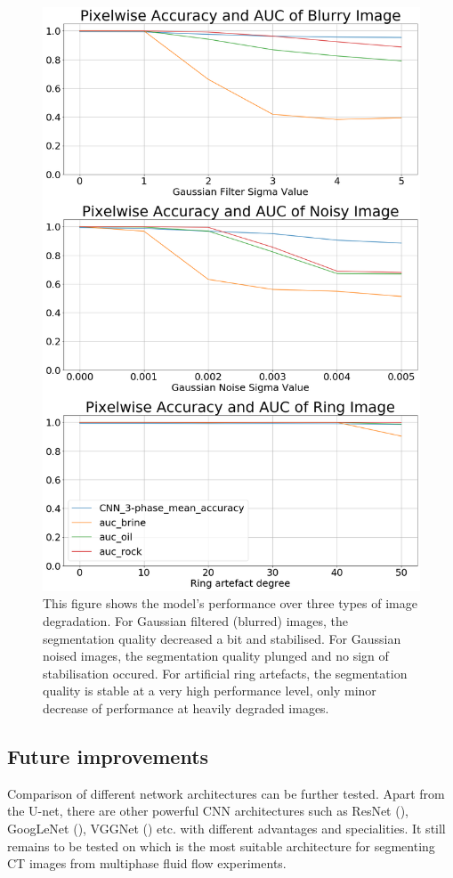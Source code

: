 \documentclass[draft,linenumbers]{agujournal2018}
\begin{document}
\begin{figure}[h]
 \centering
 \includegraphics[width=33pc]{imgs/acc_auc.png}
 \caption{This figure shows the model's performance over three types of image degradation. For Gaussian filtered (blurred) images, the segmentation quality decreased a bit and stabilised. For Gaussian noised images, the segmentation quality plunged and no sign of stabilisation occured. For artificial ring artefacts, the segmentation quality is stable at a very high performance level, only minor decrease of performance at heavily degraded images.}
 \label{robustness}
 \end{figure}
 

\subsection{Future improvements}
Comparison of different network architectures can be further tested. Apart from the U-net, there are other powerful CNN architectures such as ResNet (\citet{he2016deep}), GoogLeNet (\citet{szegedy2015going}), VGGNet (\citet{simonyan2014very}) etc. with different advantages and specialities. It still remains to be tested on which is the most suitable architecture for segmenting \textmu \textmu CT images from multiphase fluid flow experiments.
\end{document}
